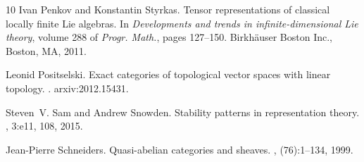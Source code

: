 \documentclass[12pt,reqno]{amsart}
\theoremstyle{definition}
\theoremstyle{remark}
\begin{document}
\begin{thebibliography}{10}
Ivan Penkov and Konstantin Styrkas.
\newblock Tensor representations of classical locally finite {L}ie algebras.
\newblock In {\em Developments and trends in infinite-dimensional {L}ie
  theory}, volume 288 of {\em Progr. Math.}, pages 127--150. Birkh\"auser
  Boston Inc., Boston, MA, 2011.

Leonid Positselski.
\newblock Exact categories of topological vector spaces with linear topology.
.
\newblock arxiv:2012.15431.

Steven~V. Sam and Andrew Snowden.
\newblock Stability patterns in representation theory.
, 3:e11, 108, 2015.

Jean-Pierre Schneiders.
\newblock Quasi-abelian categories and sheaves.
, (76):1--134, 1999.

\end{thebibliography}	
	
\end{document}
